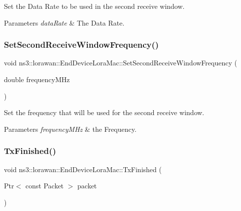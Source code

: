 Set the Data Rate to be used in the second receive window.


\begin{DoxyParams}{Parameters}
{\em data\+Rate} & The Data Rate. \\
\hline
\end{DoxyParams}
\mbox{\label{classns3_1_1lorawan_1_1EndDeviceLoraMac_a366ff7099a3ae9afb64c9ca6be521c55}} 
\subsubsection{\texorpdfstring{Set\+Second\+Receive\+Window\+Frequency()}{SetSecondReceiveWindowFrequency()}}
{\footnotesize\ttfamily void ns3\+::lorawan\+::\+End\+Device\+Lora\+Mac\+::\+Set\+Second\+Receive\+Window\+Frequency (\begin{DoxyParamCaption}\item[{double}]{frequency\+M\+Hz }\end{DoxyParamCaption})}

Set the frequency that will be used for the second receive window.


\begin{DoxyParams}{Parameters}
{\em frequency\+M\+Hz} & the Frequency. \\
\hline
\end{DoxyParams}
\mbox{\label{classns3_1_1lorawan_1_1EndDeviceLoraMac_a939732c613ae14a71c902ade45ee2e40}} 
\subsubsection{\texorpdfstring{Tx\+Finished()}{TxFinished()}}
{\footnotesize\ttfamily void ns3\+::lorawan\+::\+End\+Device\+Lora\+Mac\+::\+Tx\+Finished (\begin{DoxyParamCaption}\item[{Ptr$<$ const Packet $>$}]{packet }\end{DoxyParamCaption})\hspace{0.3cm}{\ttfamily [virtual]}}

